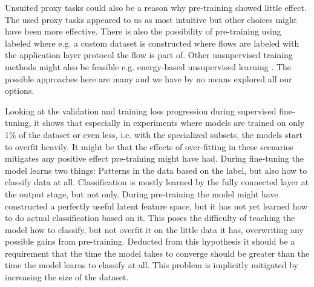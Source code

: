 Unsuited proxy tasks could also be a reason why pre-training showed little effect. The used proxy tasks appeared to us as most intuitive but other choices might have been more effective. There is also the possibility of pre-training using labeled where e.g. a custom dataset is constructed where flows are labeled with the application layer protocol the flow is part of. Other unsupervised training methods might also be feasible e.g. energy-based unsupervised learning \cite{energy_based_training}. The possible approaches here are many and we have by no means explored all our options. \par

Looking at the validation and training loss progression during supervised fine-tuning, it shows that especially in experiments where models are trained on only 1\% of the dataset or even less, i.e. with the specialized subsets, the models start to overfit heavily. It might be that the effects of over-fitting in these scenarios mitigates any positive effect pre-training might have had. During fine-tuning the model learns two things: Patterns in the data based on the label, but also how to classify data at all. Classification is mostly learned by the fully connected layer at the output stage, but not only. During pre-training the model might have constructed a perfectly useful latent feature space, but it has not yet learned how to do actual classification based on it. This poses the difficulty of teaching the model how to classify, but not overfit it on the little data it has, overwriting any possible gains from pre-training. Deducted from this hypothesis it should be a requirement that the time the model takes to converge should be greater than the time the model learns to classify at all. This problem is implicitly mitigated by increasing the size of the dataset.\par

